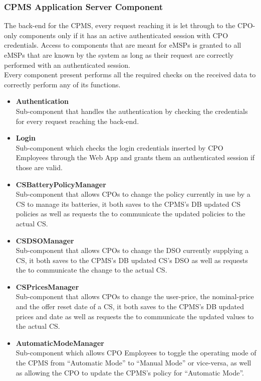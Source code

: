 \documentclass[11pt]{article}
\begin{document}
\subsubsection{CPMS Application Server Component}

The back-end for the CPMS, every request reaching it is let through to the CPO-only components only if it has an active authenticated session with CPO credentials. Access to components that are meant for eMSPs is granted to all eMSPs that are known by the system as long as their request are correctly performed with an authenticated session. \\
Every component present performs all the required checks on the received data to correctly perform any of its functions.

\begin{itemize}
    \item \textbf{Authentication} \\
        Sub-component that handles the authentication by checking the credentials for every request reaching the back-end.
    \item \textbf{Login} \\
        Sub-component which checks the login credentials inserted by CPO Employees through the Web App and grants them an authenticated session if those are valid.
    \item \textbf{CSBatteryPolicyManager} \\
        Sub-component that allows CPOs to change the policy currently in use by a CS to manage its batteries, it both saves to the CPMS's DB updated CS policies as well as requests the  to communicate the updated policies to the actual CS.
    \item \textbf{CSDSOManager} \\
        Sub-component that allows CPOs to change the DSO currently supplying a CS, it both saves to the CPMS's DB updated CS's DSO as well as requests the  to communicate the change to the actual CS.
    \item \textbf{CSPricesManager} \\
        Sub-component that allows CPOs to change the user-price, the nominal-price and the offer reset date of a CS, it both saves to the CPMS's DB updated prices and date as well as requests the  to communicate the updated values to the actual CS.
    \item \textbf{AutomaticModeManager} \\
        Sub-component which allows CPO Employees to toggle the operating mode of the CPMS from “Automatic Mode” to “Manual Mode” or vice-versa, as well as allowing the CPO to update the CPMS’s policy for “Automatic Mode”.

\end{itemize}
\end{document}
